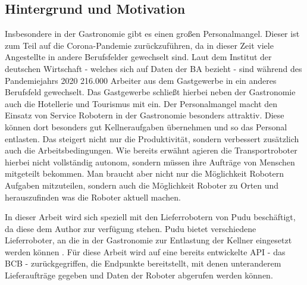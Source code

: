\subsection{Hintergrund und Motivation}
Insbesondere in der Gastronomie gibt es einen großen Personalmangel. Dieser ist zum Teil auf die Corona-Pandemie zurückzuführen, da in dieser Zeit viele Angestellte in andere Berufsfelder gewechselt sind. Laut dem Institut der deutschen Wirtschaft \cite{BA2024} - welches sich auf Daten der \ac{BA} bezieht - sind während des Pandemiejahrs 2020 216.000 Arbeiter aus dem Gastgewerbe in ein anderes Berufsfeld gewechselt. Das Gastgewerbe schließt hierbei neben der Gastronomie auch die Hotellerie und Tourismus mit ein. Der Personalmangel macht den Einsatz von Service Robotern in der Gastronomie besonders attraktiv. Diese können dort besonders gut Kellneraufgaben übernehmen und so das Personal entlasten. Das steigert nicht nur die Produktivität, sondern verbessert zusätzlich auch die Arbeitsbedingungen. Wie bereits erwähnt agieren die Transportroboter hierbei nicht vollständig autonom, sondern müssen ihre Aufträge von Menschen mitgeteilt bekommen. Man braucht aber nicht nur die Möglichkeit Robotern Aufgaben mitzuteilen, sondern auch die Möglichkeit Roboter zu Orten und herauszufinden was die Roboter aktuell machen.

In dieser Arbeit wird sich speziell mit den Lieferrobotern von Pudu beschäftigt, da diese dem Author zur verfügung stehen. Pudu bietet verschiedene Lieferroboter, an die in der Gastronomie zur Entlastung der Kellner eingesetzt werden können \cite{PUDU2024}. Für diese Arbeit wird auf eine bereits entwickelte API - das \ac{BCB} - zurückgegriffen, die Endpunkte bereitstellt, mit denen unteranderem Lieferaufträge gegeben und Daten der Roboter abgerufen werden können.


